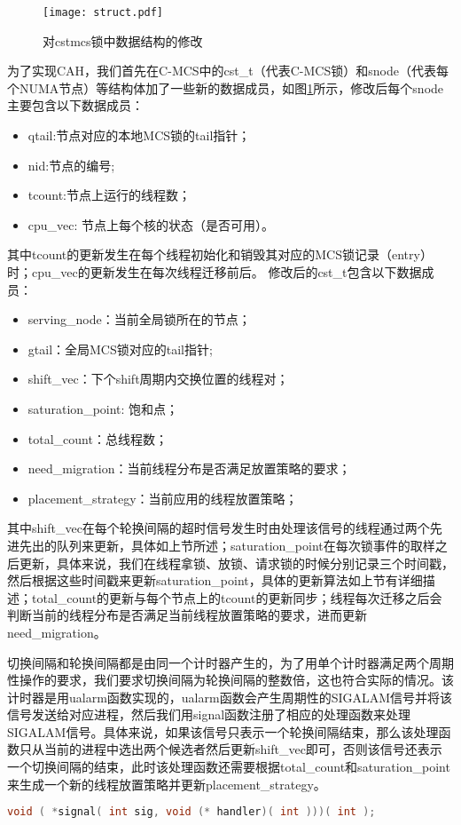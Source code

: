 \begin{figure}[t]
	\centering
	\texttt{[image: struct.pdf]}
	\caption{对cstmcs锁中数据结构的修改}
	\label{Fig:struct}
\end{figure}

为了实现CAH，我们首先在C-MCS中的cst\_t（代表C-MCS锁）和snode（代表每个NUMA节点）等结构体加了一些新的数据成员，如图\ref{Fig:struct}所示，修改后每个snode主要包含以下数据成员：
\begin{itemize}
\item qtail:节点对应的本地MCS锁的tail指针；
\item nid:节点的编号;
\item tcount:节点上运行的线程数；
\item cpu\_vec: 节点上每个核的状态（是否可用）。
\end{itemize}
其中tcount的更新发生在每个线程初始化和销毁其对应的MCS锁记录（entry）时；cpu\_vec的更新发生在每次线程迁移前后。
修改后的cst\_t包含以下数据成员：
\begin{itemize}
\item serving\_node：当前全局锁所在的节点；
\item gtail：全局MCS锁对应的tail指针;
\item shift\_vec：下个shift周期内交换位置的线程对；
\item saturation\_point: 饱和点；
\item total\_count：总线程数；
\item need\_migration：当前线程分布是否满足放置策略的要求；
\item placement\_strategy：当前应用的线程放置策略；
\end{itemize}
其中shift\_vec在每个轮换间隔的超时信号发生时由处理该信号的线程通过两个先进先出的队列来更新，具体如上节所述；saturation\_point在每次锁事件的取样之后更新，具体来说，我们在线程拿锁、放锁、请求锁的时候分别记录三个时间戳，然后根据这些时间戳来更新saturation\_point，具体的更新算法如上节有详细描述；total\_count的更新与每个节点上的tcount的更新同步；线程每次迁移之后会判断当前的线程分布是否满足当前线程放置策略的要求，进而更新need\_migration。

切换间隔和轮换间隔都是由同一个计时器产生的，为了用单个计时器满足两个周期性操作的要求，我们要求切换间隔为轮换间隔的整数倍，这也符合实际的情况。该计时器是用ualarm函数实现的，ualarm函数会产生周期性的SIGALAM信号并将该信号发送给对应进程，然后我们用signal函数注册了相应的处理函数来处理SIGALAM信号。具体来说，如果该信号只表示一个轮换间隔结束，那么该处理函数只从当前的进程中选出两个候选者然后更新shift\_vec即可，否则该信号还表示一个切换间隔的结束，此时该处理函数还需要根据total\_count和saturation\_point来生成一个新的线程放置策略并更新placement\_strategy。
\begin{lstlisting}[language={C}, caption={注册信号处理函数}]
void ( *signal( int sig, void (* handler)( int )))( int );
\end{lstlisting}

